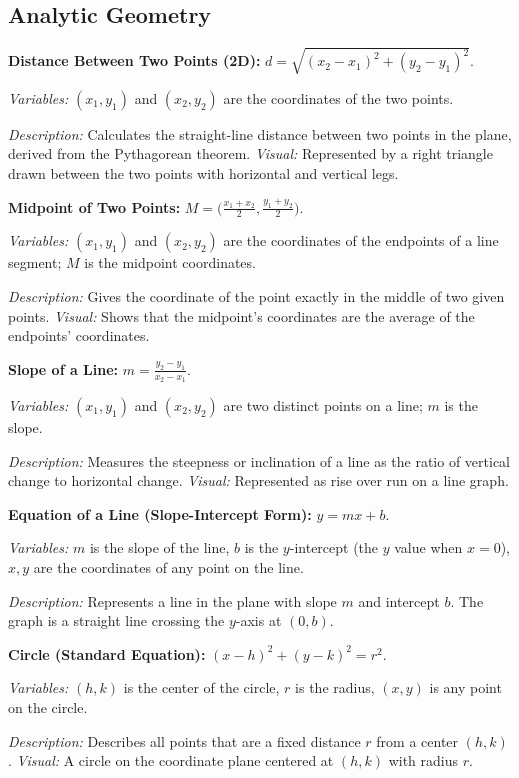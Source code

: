 \documentclass{article}
\begin{document}
\subsection*{Analytic Geometry}

\textbf{Distance Between Two Points (2D):} $d = \sqrt{(x_2 - x_1)^2 + (y_2 - y_1)^2}$.

\textit{Variables:} $(x_1, y_1)$ and $(x_2, y_2)$ are the coordinates of the two points.

\textit{Description:} Calculates the straight-line distance between two points in the plane, derived from the Pythagorean theorem. \textit{Visual:} Represented by a right triangle drawn between the two points with horizontal and vertical legs.

\textbf{Midpoint of Two Points:} $M = \Big( \frac{x_1 + x_2}{2}, \frac{y_1 + y_2}{2} \Big)$.

\textit{Variables:} $(x_1, y_1)$ and $(x_2, y_2)$ are the coordinates of the endpoints of a line segment; $M$ is the midpoint coordinates.

\textit{Description:} Gives the coordinate of the point exactly in the middle of two given points. \textit{Visual:} Shows that the midpoint’s coordinates are the average of the endpoints’ coordinates.

\textbf{Slope of a Line:} $m = \frac{y_2 - y_1}{x_2 - x_1}$.

\textit{Variables:} $(x_1, y_1)$ and $(x_2, y_2)$ are two distinct points on a line; $m$ is the slope.

\textit{Description:} Measures the steepness or inclination of a line as the ratio of vertical change to horizontal change. \textit{Visual:} Represented as rise over run on a line graph.

\textbf{Equation of a Line (Slope-Intercept Form):} $y = m x + b$.

\textit{Variables:} $m$ is the slope of the line, $b$ is the $y$-intercept (the $y$ value when $x=0$), $x,y$ are the coordinates of any point on the line.

\textit{Description:} Represents a line in the plane with slope $m$ and intercept $b$. The graph is a straight line crossing the $y$-axis at $(0,b)$.

\textbf{Circle (Standard Equation):} $(x - h)^2 + (y - k)^2 = r^2$.

\textit{Variables:} $(h, k)$ is the center of the circle, $r$ is the radius, $(x, y)$ is any point on the circle.

\textit{Description:} Describes all points that are a fixed distance $r$ from a center $(h,k)$. \textit{Visual:} A circle on the coordinate plane centered at $(h,k)$ with radius $r$.
\end{document}
